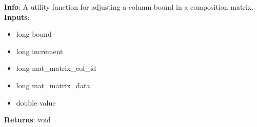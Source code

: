 \textbf{Info}: A utility function for adjusting a column bound in a composition
matrix.\\

\noindent \textbf{Inputs}:
\begin{itemize}
\item{long bound}
\item{long increment}
\item{long mat\_matrix\_col\_id}
\item{long mat\_matrix\_data}
\item{double value}
\end{itemize}

\noindent \textbf{Returns}: void
